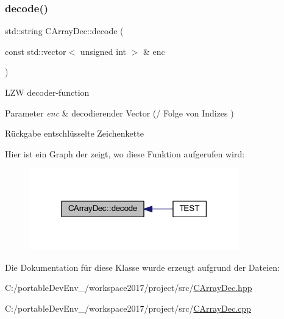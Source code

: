 \subsubsection{\texorpdfstring{decode()}{decode()}}
{\footnotesize\ttfamily std\+::string C\+Array\+Dec\+::decode (\begin{DoxyParamCaption}\item[{const std\+::vector$<$ unsigned int $>$ \&}]{enc }\end{DoxyParamCaption})}

L\+ZW decoder-\/function 
\begin{DoxyParams}{Parameter}
{\em enc} & decodierender Vector (/ Folge von Indizes ) \\
\hline
\end{DoxyParams}
\begin{DoxyReturn}{Rückgabe}
entschlüsselte Zeichenkette 
\end{DoxyReturn}
Hier ist ein Graph der zeigt, wo diese Funktion aufgerufen wird\+:
\nopagebreak
\begin{figure}[H]
\begin{center}
\leavevmode
\includegraphics[width=258pt]{class_c_array_dec_a59b83f47506de60b41728d6889d5643a_icgraph}
\end{center}
\end{figure}


Die Dokumentation für diese Klasse wurde erzeugt aufgrund der Dateien\+:\begin{DoxyCompactItemize}
\item 
C\+:/portable\+Dev\+Env\+\_/workspace2017/project/src/\hyperlink{_c_array_dec_8hpp}{C\+Array\+Dec.\+hpp}\item 
C\+:/portable\+Dev\+Env\+\_/workspace2017/project/src/\hyperlink{_c_array_dec_8cpp}{C\+Array\+Dec.\+cpp}\end{DoxyCompactItemize}
